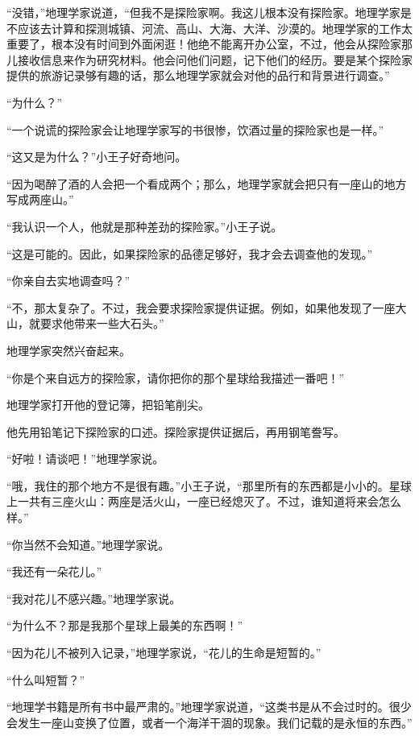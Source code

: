 “没错，”地理学家说道，“但我不是探险家啊。我这儿根本没有探险家。地理学家是不应该去计算和探测城镇、河流、高山、大海、大洋、沙漠的。地理学家的工作太重要了，根本没有时间到外面闲逛！他绝不能离开办公室，不过，他会从探险家那儿接收信息来作为研究材料。他会问他们问题，记下他们的经历。要是某个探险家提供的旅游记录够有趣的话，那么地理学家就会对他的品行和背景进行调查。”

“为什么？”

“一个说谎的探险家会让地理学家写的书很惨，饮酒过量的探险家也是一样。”

“这又是为什么？”小王子好奇地问。

“因为喝醉了酒的人会把一个看成两个；那么，地理学家就会把只有一座山的地方写成两座山。”

“我认识一个人，他就是那种差劲的探险家。”小王子说。

“这是可能的。因此，如果探险家的品德足够好，我才会去调查他的发现。”

“你亲自去实地调查吗？”

“不，那太复杂了。不过，我会要求探险家提供证据。例如，如果他发现了一座大山，就要求他带来一些大石头。”

地理学家突然兴奋起来。

“你是个来自远方的探险家，请你把你的那个星球给我描述一番吧！”

{\startalignment[center]
 \stopalignment}

地理学家打开他的登记簿，把铅笔削尖。

他先用铅笔记下探险家的口述。探险家提供证据后，再用钢笔誊写。

“好啦！请谈吧！”地理学家说。

“哦，我住的那个地方不是很有趣。”小王子说，“那里所有的东西都是小小的。星球上一共有三座火山：两座是活火山，一座已经熄灭了。不过，谁知道将来会怎么样。”

“你当然不会知道。”地理学家说。

“我还有一朵花儿。”

“我对花儿不感兴趣。”地理学家说。

“为什么不？那是我那个星球上最美的东西啊！”

“因为花儿不被列入记录，”地理学家说，“花儿的生命是短暂的。”

“什么叫短暂？”

“地理学书籍是所有书中最严肃的。”地理学家说道，“这类书是从不会过时的。很少会发生一座山变换了位置，或者一个海洋干涸的现象。我们记载的是永恒的东西。”

